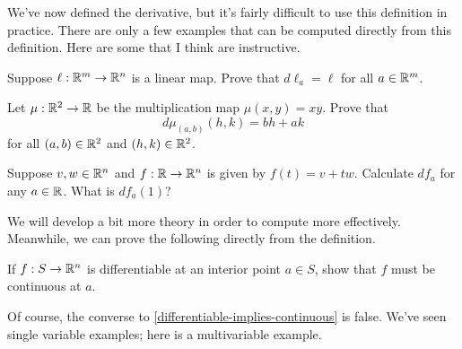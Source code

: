 We've now defined the derivative, but it's fairly difficult to use this definition in practice. There are only a few examples that can be computed directly from this definition. Here are some that I think are instructive.

\begin{exercise} \label{derivative-of-linear}
	Suppose $\ell : \mathbb{R}^m \to \mathbb{R}^n$ is a linear map. Prove that $d\ell_a = \ell$ for all $a \in \mathbb{R}^m$.  
\end{exercise}

\begin{exercise} \label{derivative-of-multiplication}
	Let $\mu : \mathbb{R}^2 \to \mathbb{R}$ be the multiplication map $\mu(x, y) = xy$. Prove that
	\[ d\mu_{(a,b)}(h, k) = bh + ak \]
	for all $(a,b) \in \mathbb{R}^2$ and $(h,k) \in \mathbb{R}^2$. 
\end{exercise}

\begin{exercise} \label{derivative-of-line}
	Suppose $v, w \in \mathbb{R}^n$ and $f : \mathbb{R} \to \mathbb{R}^n$ is given by $f(t) = v + tw$. Calculate $df_a$ for any $a \in \mathbb{R}$. What is $df_a(1)$?
\end{exercise}

We will develop a bit more theory in order to compute more effectively. Meanwhile, we can prove the following directly from the definition. 

\begin{exercise} \label{differentiable-implies-continuous}
	If $f : S \to \mathbb{R}^n$ is differentiable at an interior point $a \in S$, show that $f$ must be continuous at $a$. 
\end{exercise}

Of course, the converse to \cref{differentiable-implies-continuous} is false. We've seen single variable examples; here is a multivariable example. 

